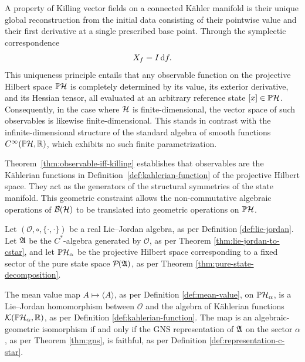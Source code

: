 \begin{remark}
	A property of Killing vector fields on a connected Kähler manifold is their unique global reconstruction from the initial data consisting of their pointwise value and their first derivative at a single prescribed base point. Through the symplectic correspondence
	\[
		X_{f} = I\,\mathrm{d}f.
	\]
	This uniqueness principle entails that any observable function on the projective Hilbert space \(\PH\) is completely determined by its value, its exterior derivative, and its Hessian tensor, all evaluated at an arbitrary reference state \([x] \in \PH\). Consequently, in the case where \(\H\) is finite-dimensional, the vector space of such observables is likewise finite-dimensional. This stands in contrast with the infinite-dimensional structure of the standard algebra of smooth functions \(C^{\infty}(\PH, \R)\), which exhibits no such finite parametrization.
\end{remark}

Theorem~\ref{thm:observable-iff-killing} establishes that observables are the Kählerian functions in Definition~\ref{def:kahlerian-function} of the projective Hilbert space. They act as the generators of the structural symmetries of the state manifold. This geometric constraint allows the non-commutative algebraic operations of $\BH$ to be translated  into  geometric operations on $\PH$.

\begin{theorem}
	\label{thm:lie-jordan-kahler-isomorphism}
	Let $(\mathcal{O},\circ,\{\cdot,\cdot\})$ be a real Lie--Jordan algebra, as per Definition \ref{def:lie-jordan}. Let $\mathfrak{A}$ be the $C^*$-algebra generated by $\mathcal{O}$, as per Theorem \ref{thm:lie-jordan-to-cstar}, and let $\PH_\alpha$ be the projective Hilbert space corresponding to a fixed sector of the pure state space $\mathcal{P}(\A)$, as per Theorem \ref{thm:pure-state-decomposition}. 
	
	The mean value map $A \mapsto \langle A \rangle$, as per Definition \ref{def:mean-value}, on $\PH_\alpha$, is a Lie--Jordan homomorphism between $\mathcal{O}$ and the algebra of Kählerian functions $\mathcal{K}(\PH_\alpha,\R)$, as per Definition \ref{def:kahlerian-function}. The map is an algebraic-geometric isomorphism if and only if the GNS representation of $\mathfrak{A}$ on the sector $\alpha$, as per Theorem \ref{thm:gns}, is faithful, as per Definition \ref{def:representation-c-star}.
\end{theorem}


